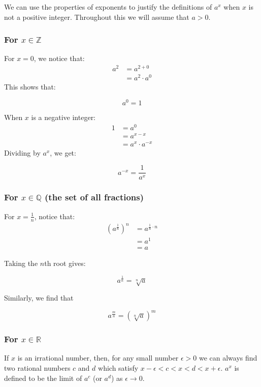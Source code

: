 We can use the properties of exponents to justify the definitions of \(a^x\) when \(x\) is not a positive integer. Throughout this we will assume that \(a>0\).

\subsubsection{For \(x\in\mathbb{Z}\)}
For \(x=0\), we notice that:
\begin{align*}
a^2 &= a^{2+0}\\ &= a^2\cdot a^0
\end{align*}
This shows that:
\begin{in_a_box}
$$a^0=1$$
\end{in_a_box}

When \(x\) is a negative integer:
\begin{align*}
1 &= a^0\\ &= a^{x-x}\\ &= a^x\cdot a^{-x}
\end{align*}
Dividing by \(a^{x}\), we get:
\begin{in_a_box}
$$a^{-x}=\frac{1}{a^x}$$
\end{in_a_box}

\subsubsection{For \(x\in\mathbb{Q}\) (the set of all fractions)}

For \(x=\frac{1}{n}\), notice that:
\begin{align*}
\left(a^{\frac{1}{n}}\right)^n &= a^{\frac{1}{n}\cdot n}\\ &= a^1\\ &= a
\end{align*}

Taking the \(n\)th root gives:
\begin{in_a_box}
$$a^\frac{1}{n} = \sqrt[n]{a}$$
\end{in_a_box}

Similarly, we find that
\begin{in_a_box}
$$a^\frac{m}{n} = \left(\sqrt[n]{a}\right)^m$$
\end{in_a_box}

\subsubsection{For \(x\in\mathbb{R}\)}

If $x$ is an irrational number, then, for any small number \(\epsilon>0\) we can always find two rational numbers $c$ and $d$ which satisfy $x-\epsilon<c<x<d<x+\epsilon$.
$a^x$ is defined to be the limit of \(a^c\) (or \(a^d\)) as \(\epsilon\rightarrow0\).

